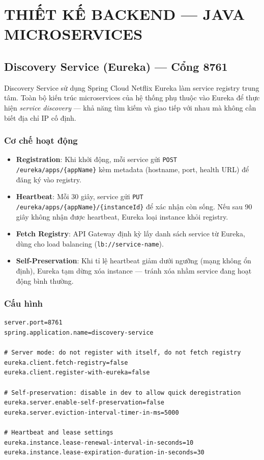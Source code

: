 \documentclass[12pt,a4paper]{report}
\begin{document}
\chapter{THIẾT KẾ BACKEND --- JAVA MICROSERVICES}

\section{Discovery Service (Eureka) --- Cổng 8761}

Discovery Service sử dụng Spring Cloud Netflix Eureka làm service registry trung tâm. Toàn bộ kiến trúc microservices của hệ thống phụ thuộc vào Eureka để thực hiện \textit{service discovery} --- khả năng tìm kiếm và giao tiếp với nhau mà không cần biết địa chỉ IP cố định.

\subsection{Cơ chế hoạt động}

\begin{itemize}
  \item \textbf{Registration}: Khi khởi động, mỗi service gửi \texttt{POST /eureka/apps/\{appName\}} kèm metadata (hostname, port, health URL) để đăng ký vào registry.
  \item \textbf{Heartbeat}: Mỗi 30 giây, service gửi \texttt{PUT /eureka/apps/\{appName\}/\{instanceId\}} để xác nhận còn sống. Nếu sau 90 giây không nhận được heartbeat, Eureka loại instance khỏi registry.
  \item \textbf{Fetch Registry}: API Gateway định kỳ lấy danh sách service từ Eureka, dùng cho load balancing (\texttt{lb://service-name}).
  \item \textbf{Self-Preservation}: Khi tỉ lệ heartbeat giảm dưới ngưỡng (mạng không ổn định), Eureka tạm dừng xóa instance --- tránh xóa nhầm service đang hoạt động bình thường.
\end{itemize}

\subsection{Cấu hình}

\begin{lstlisting}[style=javaStyle, caption={Cấu hình Eureka Server (application.properties)}, label={lst:eureka}]
server.port=8761
spring.application.name=discovery-service

# Server mode: do not register with itself, do not fetch registry
eureka.client.fetch-registry=false
eureka.client.register-with-eureka=false

# Self-preservation: disable in dev to allow quick deregistration
eureka.server.enable-self-preservation=false
eureka.server.eviction-interval-timer-in-ms=5000

# Heartbeat and lease settings
eureka.instance.lease-renewal-interval-in-seconds=10
eureka.instance.lease-expiration-duration-in-seconds=30
\end{lstlisting}
\end{document}
